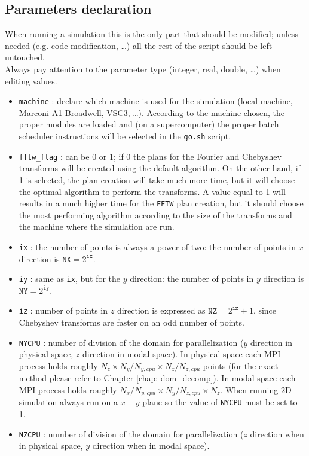 \subsection{Parameters declaration}
When running a simulation this is the only part that should be modified; unless needed (e.g. code modification, \dots) all the rest of the script should be left untouched.\\
Always pay attention to the parameter type (integer, real, double, \dots) when editing values.
\begin{itemize}
\item \texttt{machine} : declare which machine is used for the simulation (local machine, Marconi A1 Broadwell, VSC3, \dots). According to the machine chosen, the proper modules are loaded and (on a supercomputer) the proper batch scheduler instructions will be selected in the \texttt{go.sh} script.
\item \texttt{fftw\_flag} : can be 0 or 1; if 0 the plans for the Fourier and Chebyshev transforms will be created using the default algorithm. On the other hand, if 1 is selected, the plan creation will take much more time, but it will choose the optimal algorithm to perform the transforms. A value equal to 1 will results in a much higher time for the \texttt{FFTW} plan creation, but it should choose the most performing algorithm according to the size of the transforms and the machine where the simulation are run.
\item \texttt{ix} : the number of points is always a power of two: the number of points in $x$ direction is $\texttt{NX}=2^\texttt{ix}$.
\item \texttt{iy} : same as \texttt{ix}, but for the $y$ direction: the number of points in $y$ direction is $\texttt{NY}=2^\texttt{iy}$.
\item \texttt{iz} : number of points in $z$ direction is expressed as $\texttt{NZ}=2^\texttt{iz}+1$, since Chebyshev transforms are faster on an odd number of points.
\item \texttt{NYCPU} : number of division of the domain for parallelization ($y$ direction in physical space, $z$ direction in modal space). In physical space each MPI process holds roughly $N_z\times N_y/N_{y,cpu} \times N_z/N_{z,cpu}$ points (for the exact method please refer to Chapter \ref{chap: dom_decomp}). In modal space each MPI process holds roughly $N_x/N_{y,cpu}\times N_y/N_{z,cpu}\times N_z$. When running 2D simulation always run on a $x-y$ plane so the value of \texttt{NYCPU} must be set to 1.
\item \texttt{NZCPU} : number of division of the domain for parallelization ($z$ direction when in physical space, $y$ direction when in modal space).

\end{itemize}
